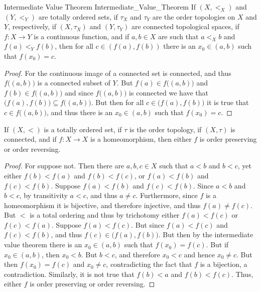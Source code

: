 \documentclass[oneside]{book}                                                  %
\begin{document}
            \begin{ltheorem}{Intermediate Value Theorem}
                            {Intermediate_Value_Theorem}
                If $(X,<_{X})$ and $(Y,<_{Y})$ are totally ordered sets, if
                $\tau_{X}$ and $\tau_{Y}$ are the order topologies on $X$ and
                $Y$, respectively, if $(X,\tau_{X})$ and $(Y,\tau_{Y})$ are
                connected topological spaces, if $f:X\rightarrow{Y}$ is a
                continuous function, and if $a,b\in{X}$ are such that $a<_{X}b$
                and $f(a)<_{Y}f(b)$, then for all $c\in(f(a),f(b))$ there is an
                $x_{0}\in(a,b)$ such that $f(x_{0})=c$.
            \end{ltheorem}
            \begin{proof}
                For the continuous image of a connected set is connected, and
                thus $f\big((a,b)\big)$ is a connected subset of $Y$. But
                $f(a)\in{f}\big((a,b)\big)$ and $f(b)\in{f}\big((a,b)\big)$ and
                since $f\big((a,b)\big)$ is connected we have that
                $\big(f(a),f(b)\big)\subseteq{f}\big((a,b)\big)$. But then for
                all $c\in\big(f(a),f(b)\big)$ it is true that
                $c\in{f}\big((a,b)\big)$, and thus there is an $x_{0}\in(a,b)$
                such that $f(x_{0})=c$.
            \end{proof}
            \begin{theorem}
                If $(X,<)$ is a totally ordered set, if $\tau$ is the order
                topology, if $(X,\tau)$ is connected, and if $f:X\rightarrow{X}$
                is a homeomorphism, then either $f$ is order preserving or
                order reversing.
            \end{theorem}
            \begin{proof}
                For suppose not. Then there are $a,b,c\in{X}$ such that
                $a<b$ and $b<c$, yet either $f(b)<f(a)$ and $f(b)<f(c)$, or
                $f(a)<f(b)$ and $f(c)<f(b)$. Suppose $f(a)<f(b)$ and
                $f(c)<f(b)$. Since $a<b$ and $b<c$, by transitivity $a<c$, and
                thus $a\ne{c}$. Furthermore, since $f$ is a homeomorphism it is
                bijective, and therefore injective, and thus $f(a)\ne{f}(c)$.
                But $<$ is a total ordering and thus by trichotomy either
                $f(a)<f(c)$ or $f(c)<f(a)$. Suppose $f(a)<f(c)$. But since
                $f(a)<f(c)$ and $f(c)<f(b)$, and thus
                $f(c)\in\big(f(a),f(b)\big)$. But then by the intermediate value
                theorem there is an $x_{0}\in(a,b)$ such that $f(x_{0})=f(c)$.
                But if $x_{0}\in(a,b)$, then $x_{0}<b$. But $b<c$, and therefore
                $x_{0}<c$ and hence $x_{0}\ne{c}$. But then $f(x_{0})=f(c)$ and
                $x_{0}\ne{c}$, contradicting the fact that $f$ is a bijection,
                a contradiction. Similarly, it is not true that $f(b)<a$ and
                $f(b)<f(c)$. Thus, either $f$ is order preserving or order
                reversing.
            \end{proof}
\end{document}
